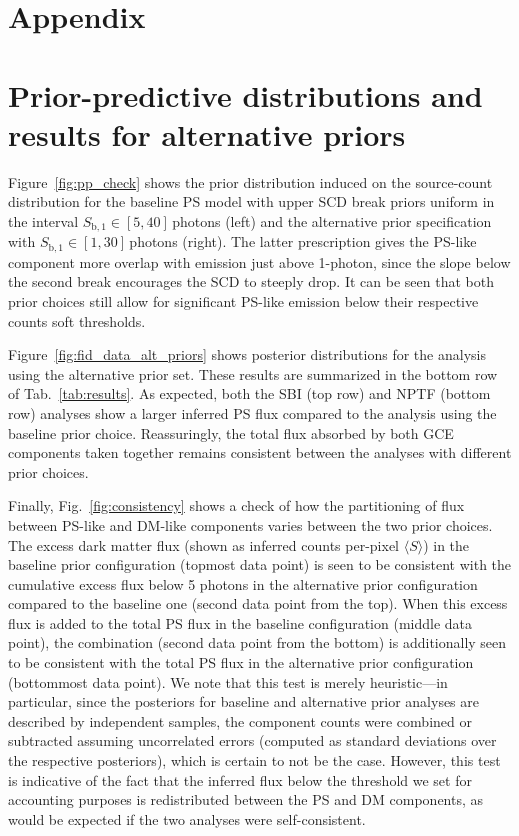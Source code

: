 \documentclass[prd,aps,10pt,nofootinbib,twocolumn,superscriptaddress,preprintnumbers,balancelastpage,longbibliography,floatfix]{revtex4-2}
\begin{document}
\vspace{.5cm}

\appendix
\section*{Appendix}

\section{Prior-predictive distributions and results for alternative priors}
\label{app:priors}

Figure~\ref{fig:pp_check} shows the prior distribution induced on the source-count distribution for the baseline PS model with upper SCD break priors uniform in the interval $S_{\mathrm{b}, 1}  \in  [5, 40]$\,photons (left) and the alternative prior specification with $S_{\mathrm{b}, 1}  \in  [1, 30]$\,photons (right). The latter prescription gives the PS-like component more overlap with emission just above 1-photon, since the slope below the second break encourages the SCD to steeply drop. It can be seen that both prior choices still allow for significant PS-like emission below their respective counts soft thresholds.

Figure~\ref{fig:fid_data_alt_priors} shows posterior distributions for the analysis using the alternative prior set. These results are summarized in the bottom row of Tab.~\ref{tab:results}. As expected, both the SBI (top row) and NPTF (bottom row) analyses show a larger inferred PS flux compared to the analysis using the baseline prior choice. Reassuringly, the total flux absorbed by both GCE components taken together remains consistent between the analyses with different prior choices.

Finally, Fig.~\ref{fig:consistency} shows a check of how the partitioning of flux between PS-like and DM-like components varies between the two prior choices. 
The excess dark matter flux (shown as inferred counts per-pixel $\langle S \rangle$) in the baseline prior configuration (topmost data point) is seen to be consistent with the cumulative excess flux below 5 photons in the alternative prior configuration compared to the baseline one (second data point from the top). When this excess flux is added to the total PS flux in the baseline configuration (middle data point), the combination (second data point from the bottom) is additionally seen to be consistent with the total PS flux in the alternative prior configuration (bottommost data point). We note that this test is merely heuristic---in particular, since the posteriors for baseline and alternative prior analyses are described by independent samples, the component counts were combined or subtracted assuming uncorrelated errors (computed as standard deviations over the respective posteriors), which is certain to not be the case. However, this test is indicative of the fact that the inferred flux below the threshold we set for accounting purposes is redistributed between the PS and DM components, as would be expected if the two analyses were self-consistent.
\end{document}
